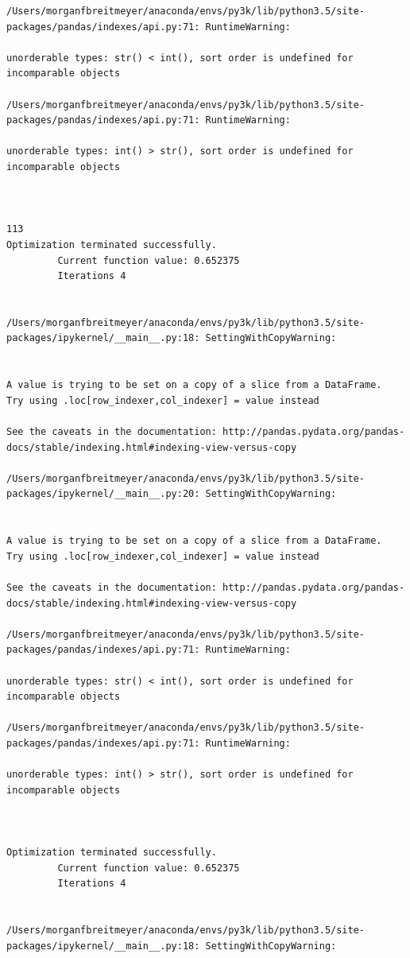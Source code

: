 \begin{lstlisting}
/Users/morganfbreitmeyer/anaconda/envs/py3k/lib/python3.5/site-packages/pandas/indexes/api.py:71: RuntimeWarning:

unorderable types: str() < int(), sort order is undefined for incomparable objects

/Users/morganfbreitmeyer/anaconda/envs/py3k/lib/python3.5/site-packages/pandas/indexes/api.py:71: RuntimeWarning:

unorderable types: int() > str(), sort order is undefined for incomparable objects



113
Optimization terminated successfully.
         Current function value: 0.652375
         Iterations 4


/Users/morganfbreitmeyer/anaconda/envs/py3k/lib/python3.5/site-packages/ipykernel/__main__.py:18: SettingWithCopyWarning:


A value is trying to be set on a copy of a slice from a DataFrame.
Try using .loc[row_indexer,col_indexer] = value instead

See the caveats in the documentation: http://pandas.pydata.org/pandas-docs/stable/indexing.html#indexing-view-versus-copy

/Users/morganfbreitmeyer/anaconda/envs/py3k/lib/python3.5/site-packages/ipykernel/__main__.py:20: SettingWithCopyWarning:


A value is trying to be set on a copy of a slice from a DataFrame.
Try using .loc[row_indexer,col_indexer] = value instead

See the caveats in the documentation: http://pandas.pydata.org/pandas-docs/stable/indexing.html#indexing-view-versus-copy

/Users/morganfbreitmeyer/anaconda/envs/py3k/lib/python3.5/site-packages/pandas/indexes/api.py:71: RuntimeWarning:

unorderable types: str() < int(), sort order is undefined for incomparable objects

/Users/morganfbreitmeyer/anaconda/envs/py3k/lib/python3.5/site-packages/pandas/indexes/api.py:71: RuntimeWarning:

unorderable types: int() > str(), sort order is undefined for incomparable objects



Optimization terminated successfully.
         Current function value: 0.652375
         Iterations 4


/Users/morganfbreitmeyer/anaconda/envs/py3k/lib/python3.5/site-packages/ipykernel/__main__.py:18: SettingWithCopyWarning:



\end{lstlisting}
